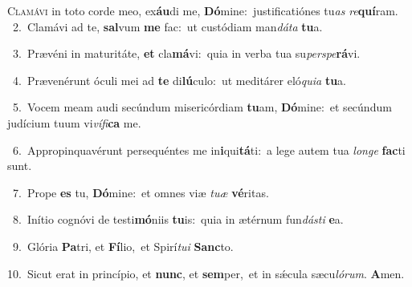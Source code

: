 \lettrine{\initial\textcolor{\initialcolor}{C}}{lamávi} in toto corde meo, ex\-\textbf{áu}\-di me, \textbf{Dó}\-mine:~\star justificatiónes tu\textit{as} \textit{re}\-\textbf{quí}ram.\\
{\numbfont\textcolor{\numbcolor}{~2.}}~Clamávi ad te, \textbf{sal}\-vum \textbf{me} fac:~\star ut custódiam man\-\textit{dá}\-\textit{ta} \textbf{tu}\-a.\par
{\numbfont\textcolor{\numbcolor}{~3.}}~Prævéni in maturitáte, \textbf{et} cla\-\textbf{má}\-vi:~\star quia in verba tua su\-\textit{per}\-\textit{spe}\textbf{rá}vi.\par
{\numbfont\textcolor{\numbcolor}{~4.}}~Prævenérunt óculi mei ad \textbf{te} di\-\textbf{lú}\-culo:~\star ut meditárer eló\-\textit{qui}\-\textit{a} \textbf{tu}\-a.\par
{\numbfont\textcolor{\numbcolor}{~5.}}~Vocem meam audi secúndum misericórdiam \textbf{tu}\-am, \textbf{Dó}\-mine:~\star et secúndum judícium tuum vi\-\textit{ví}\-\textit{fi}\textbf{ca} me.\par
{\numbfont\textcolor{\numbcolor}{~6.}}~Appropinquavérunt persequéntes me in\-\textbf{i}\-qui\-\textbf{tá}\-ti:~\star a lege autem tua \textit{lon}\-\textit{ge} \textbf{fac}\-ti sunt.\par
{\numbfont\textcolor{\numbcolor}{~7.}}~Prope \textbf{es} tu, \textbf{Dó}\-mine:~\star et omnes viæ \textit{tu}\-\textit{æ} \textbf{vé}\-ritas.\par
{\numbfont\textcolor{\numbcolor}{~8.}}~Inítio cognóvi de testi\-\textbf{mó}\-niis \textbf{tu}\-is:~\star quia in ætérnum fun\-\textit{dás}\-\textit{ti} \textbf{e}\-a.\par
{\numbfont\textcolor{\numbcolor}{~9.}}~Glória \textbf{Pa}\-tri, et \textbf{Fí}\-lio,~\star et Spirí\-\textit{tu}\-\textit{i} \textbf{Sanc}\-to.\par
{\numbfont\textcolor{\numbcolor}{10.}}~Sicut erat in princípio, et \textbf{nunc}\-, et \textbf{sem}\-per,~\star et in sǽcula sæcu\-\textit{ló}\-\textit{rum}. \textbf{A}\-men.\par
